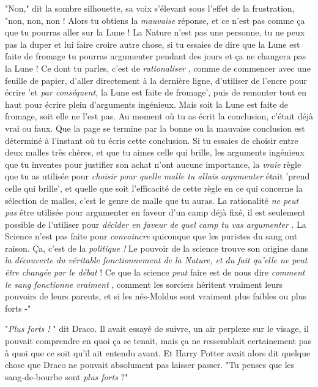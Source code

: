 "Non," dit la sombre silhouette, sa voix s'élevant sous l'effet de la frustration, "non, non, non ! Alors tu obtiens la \emph{mauvaise}  réponse, et ce n'est pas comme ça que tu pourras aller sur la Lune ! La Nature n'est pas une personne, tu ne peux pas la duper et lui faire croire autre chose, si tu essaies de dire que la Lune est faite de fromage tu pourras argumenter pendant des jours et ça ne changera pas la Lune ! Ce dont tu parles, c'est de \emph{rationaliser} , comme de commencer avec une feuille de papier, d'aller directement à la dernière ligne, d'utiliser de l'encre pour écrire 'et \emph{par conséquent,}  la Lune est faite de fromage', puis de remonter tout en haut pour écrire plein d'arguments ingénieux. Mais soit la Lune est faite de fromage, soit elle ne l'est pas. Au moment où tu as écrit la conclusion, c'était déjà vrai ou faux. Que la page se termine par la bonne ou la mauvaise conclusion est déterminé à l'instant où tu écris cette conclusion. Si tu essaies de choisir entre deux malles très chères, et que tu aimes celle qui brille, les arguments ingénieux que tu inventes pour justifier son achat n'ont aucune importance, la \emph{vraie}  règle que tu as utilisée pour \emph{choisir pour quelle malle tu allais argumenter}  était 'prend celle qui brille', et quelle que soit l'efficacité de cette règle en ce qui concerne la sélection de malles, c'est le genre de malle que tu auras. La rationalité \emph{ne peut pas}  être utilisée pour argumenter en faveur d'un camp déjà fixé, il est seulement possible de l'utiliser pour \emph{décider en faveur de quel camp tu vas argumenter} . La Science n'est pas faite pour \emph{convaincre}  quiconque que les puristes du sang ont raison. Ça, c'est de la \emph{politique !}  Le pouvoir de la science trouve son origine dans \emph{la découverte du véritable fonctionnement de la Nature, et du fait qu'elle ne peut être changée par le débat}  ! Ce que la science \emph{peut}  faire est de nous dire \emph{comment le sang fonctionne vraiment} , comment les sorciers héritent vraiment leurs pouvoirs de leurs parents, et si les nés-Moldus sont vraiment plus faibles ou plus forts -"

"\emph{Plus forts !} " dit Draco. Il avait essayé de suivre, un air perplexe sur le visage, il pouvait comprendre en quoi ça se tenait, mais ça ne ressemblait certainement pas à quoi que ce soit qu'il ait entendu avant. Et Harry Potter avait alors dit quelque chose que Draco ne pouvait absolument pas laisser passer. "Tu penses que les sang-de-bourbe sont \emph{plus forts}  ?"

